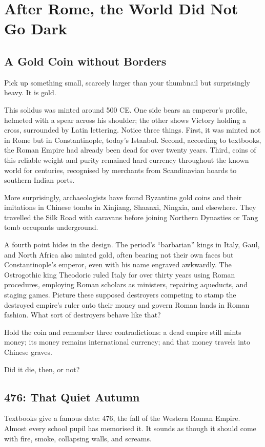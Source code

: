 \chapter[The World after Rome]{After Rome, the World Did Not Go Dark}
\section{A Gold Coin without Borders}
Pick up something small, scarcely larger than your thumbnail but surprisingly heavy. It is gold.

This solidus was minted around 500 CE. One side bears an emperor's profile, helmeted with a spear across his shoulder; the other shows Victory holding a cross, surrounded by Latin lettering. Notice three things. First, it was minted not in Rome but in Constantinople, today's Istanbul. Second, according to textbooks, the Roman Empire had already been dead for over twenty years. Third, coins of this reliable weight and purity remained hard currency throughout the known world for centuries, recognised by merchants from Scandinavian hoards to southern Indian ports.

More surprisingly, archaeologists have found Byzantine gold coins and their imitations in Chinese tombs in Xinjiang, Shaanxi, Ningxia, and elsewhere. They travelled the Silk Road with caravans before joining Northern Dynasties or Tang tomb occupants underground.

A fourth point hides in the design. The period's ``barbarian'' kings in Italy, Gaul, and North Africa also minted gold, often bearing not their own faces but Constantinople's emperor, even with his name engraved awkwardly. The Ostrogothic king Theodoric ruled Italy for over thirty years using Roman procedures, employing Roman scholars as ministers, repairing aqueducts, and staging games. Picture these supposed destroyers competing to stamp the destroyed empire's ruler onto their money and govern Roman lands in Roman fashion. What sort of destroyers behave like that?

Hold the coin and remember three contradictions: a dead empire still mints money; its money remains international currency; and that money travels into Chinese graves.

Did it die, then, or not?

\section{476: That Quiet Autumn}
Textbooks give a famous date: 476, the fall of the Western Roman Empire. Almost every school pupil has memorised it. It sounds as though it should come with fire, smoke, collapsing walls, and screams.

